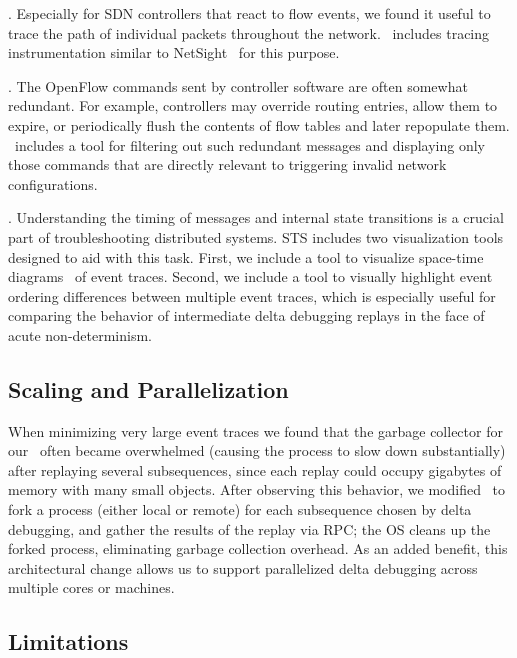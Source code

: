 . Especially for SDN controllers that react to
flow events, we found it useful to trace the path of individual
packets throughout the network. \projectname~includes tracing instrumentation
similar to NetSight~\cite{ndb} for this purpose.

. The OpenFlow commands sent by controller software
are often somewhat redundant. For example, controllers may override routing
entries, allow them to expire, or periodically flush the
contents of flow tables and later repopulate them. \projectname~includes a
tool for filtering out such redundant messages and
displaying only those commands that are directly relevant to triggering invalid network
configurations.

. Understanding the timing of messages and internal
state transitions is a crucial part of troubleshooting distributed systems.
STS includes two visualization tools designed to aid with this task. First, we
include a tool to visualize space-time diagrams~\cite{Lamport:1978:TCO:359545.359563}
of event traces.
Second, we include a tool to visually highlight event ordering differences
between multiple event traces, which is especially useful for comparing the behavior of
intermediate delta debugging replays in the face of acute non-determinism.

\subsection{Scaling and Parallelization}
When minimizing very large event traces we found that the garbage collector
for our \tester~often became overwhelmed (causing the process to slow down
substantially) after replaying several subsequences, since each replay could
occupy gigabytes of memory with many small objects.
After observing this behavior, we modified \projectname~to fork a process
(either local or remote) for each subsequence chosen by delta debugging,
and gather the results of the replay via RPC; the OS cleans up the forked process,
eliminating garbage collection overhead.
As an added benefit, this architectural change allows us to support
parallelized delta debugging across multiple cores or machines.

\subsection{Limitations}
\label{subsec:non_goals}


